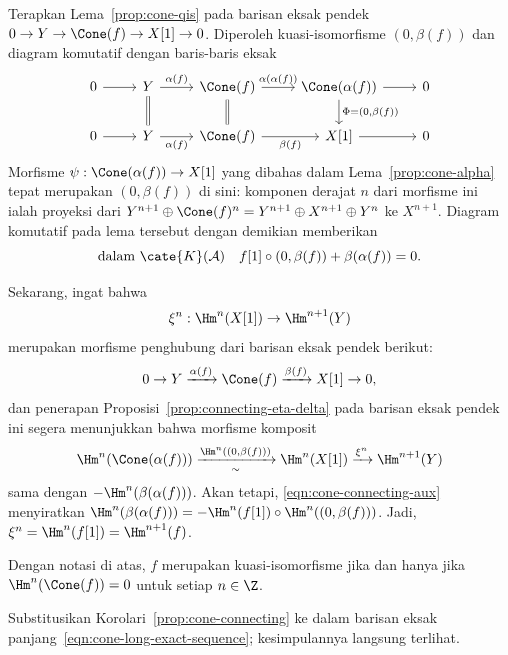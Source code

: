 \begin{bukti}
	Terapkan Lema~\ref{prop:cone-qis} pada barisan eksak pendek
	$0\to Y\to\Cone(f)\to X[1]\to0$. Diperoleh kuasi-isomorfisme
	$(0,\beta(f))$ dan diagram komutatif dengan baris-baris eksak
	\[\begin{tikzcd}
		0 \arrow[r] & Y \arrow[r, "\alpha(f)"] & \Cone(f) \arrow[r, "{\alpha(\alpha(f))}"] & \Cone(\alpha(f)) \arrow[d, "{\Phi = (0, \beta(f))}"] \arrow[r] & 0 \\
		0 \arrow[r] & Y \arrow[r, "\alpha(f)"'] \arrow[equal, u] & \Cone(f) \arrow[r, "\beta(f)"'] \arrow[equal, u] & X[1] \arrow[r] & 0
	\end{tikzcd}\]
	Morfisme $\psi:\Cone(\alpha(f))\to X[1]$ yang dibahas dalam
	Lema~\ref{prop:cone-alpha} tepat merupakan $(0,\beta(f))$ di sini:
	komponen derajat $n$ dari morfisme ini ialah proyeksi dari
	$Y^{n+1}\oplus\Cone(f)^n=Y^{n+1}\oplus X^{n+1}\oplus Y^n$ ke
	$X^{n+1}$. Diagram komutatif pada lema tersebut dengan demikian memberikan
	\begin{equation}\label{eqn:cone-connecting-aux}
		\text{dalam $\cate{K}(\mathcal{A})$} \quad f[1] \circ (0, \beta(f)) + \beta(\alpha(f)) = 0 .
	\end{equation}

	Sekarang, ingat bahwa
	\[
		\xi^n:\Hm^n(X[1])\to\Hm^{n+1}(Y)
	\]
	merupakan morfisme penghubung dari barisan eksak pendek berikut:
	\[ 0 \to Y \xrightarrow{\alpha(f)} \Cone(f) \xrightarrow{\beta(f)} X[1] \to 0, \]
	dan penerapan Proposisi~\ref{prop:connecting-eta-delta} pada barisan eksak
	pendek ini segera menunjukkan bahwa morfisme komposit
	\[ \Hm^n(\Cone(\alpha(f))) \xrightarrow[\sim]{\Hm^n((0, \beta(f)))} \Hm^n(X[1]) \xrightarrow{\xi^n} \Hm^{n+1}(Y) \]
	sama dengan $-\Hm^n(\beta(\alpha(f)))$. Akan tetapi,
	\eqref{eqn:cone-connecting-aux} menyiratkan
	$\Hm^n(\beta(\alpha(f)))=-\Hm^n(f[1])\circ
	\Hm^n((0,\beta(f)))$. Jadi,
	$\xi^n=\Hm^n(f[1])=\Hm^{n+1}(f)$.
\end{bukti}

\begin{korolari}\label{prop:quism-cone}
	Dengan notasi di atas, $f$ merupakan kuasi-isomorfisme jika dan hanya jika
	$\Hm^n(\Cone(f))=0$ untuk setiap $n\in\Z$.
\end{korolari}

\begin{bukti}
	Substitusikan Korolari~\ref{prop:cone-connecting} ke dalam barisan eksak
	panjang~\eqref{eqn:cone-long-exact-sequence}; kesimpulannya langsung
	terlihat.
\end{bukti}
